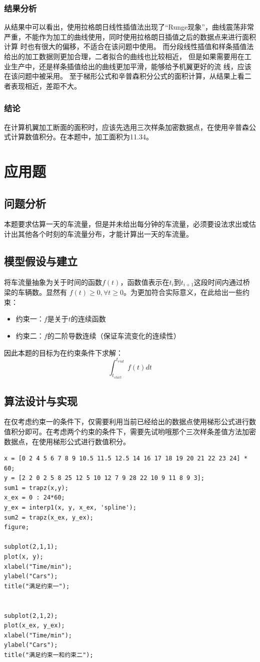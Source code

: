 \documentclass{article}
\begin{document}
\subsubsection{结果分析}

从结果中可以看出，使用拉格朗日线性插值法出现了“Runge现象”，曲线震荡非常 严重，不能作为加工的曲线使用，同时使用拉格朗日插值之后的数据点来进行面积计算 时也有很大的偏移，不适合在该问题中使用。
而分段线性插值和样条插值法给出的加工数据则更加合理，二者拟合的曲线也比较相近， 但是如果需要用在工业生产中，还是样条插值给出的曲线更加平滑，能够给予机翼更好的流 线，应该在该问题中被采用。
至于梯形公式和辛普森积分公式的面积计算，从结果上看二者表现相近，差距不大。
\subsubsection{结论}

在计算机翼加工断面的面积时，应该先选用三次样条加密数据点，在使用辛普森公式计算数值积分。在本题中，加工面积为11.34。

\newpage
\section{应用题}

\subsection{问题分析}
本题要求估算一天的车流量，但是并未给出每分钟的车流量，必须要设法求出或估计出其他各个时刻的车流量分布，才能计算出一天的车流量。
\subsection{模型假设与建立}
将车流量抽象为关于时间的函数$f(t)$，函数值表示在$t_{i}$到$t_{i+1}$这段时间内通过桥梁的车辆数。显然有 $f(t)\geq0, \forall t \geq 0$。为更加符合实际意义，在此给出一些约束：
\begin{itemize}
	\item{约束一：$f$是关于$t$的连续函数}
	\item{约束二：$f$的二阶导数连续（保证车流变化的连续性）}
\end{itemize}
因此本题的目标为在约束条件下求解：$$\int_{t_{start}}^{t_{end}}f(t)dt$$
\subsection{算法设计与实现}
在仅考虑约束一的条件下，仅需要利用当前已经给出的数据点使用梯形公式进行数值积分即可。在考虑两个约束的条件下，需要先试哟哦那个三次样条差值方法加密数据点，在使用梯形公式进行数值积分。
\begin{lstlisting}
x = [0 2 4 5 6 7 8 9 10.5 11.5 12.5 14 16 17 18 19 20 21 22 23 24] * 60;
y = [2 2 0 2 5 8 25 12 5 10 12 7 9 28 22 10 9 11 8 9 3];
sum1 = trapz(x,y);
x_ex = 0 : 24*60;
y_ex = interp1(x, y, x_ex, 'spline');
sum2 = trapz(x_ex, y_ex);
figure;

subplot(2,1,1);
plot(x, y);
xlabel("Time/min");
ylabel("Cars");
title("满足约束一");


subplot(2,1,2);
plot(x_ex, y_ex);
xlabel("Time/min");
ylabel("Cars");
title("满足约束一和约束二");

\end{lstlisting}
\end{document}
